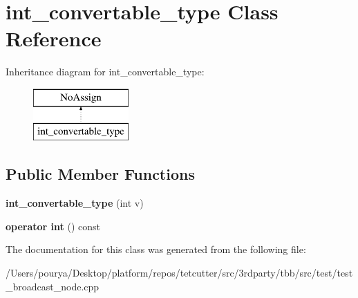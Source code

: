 \hypertarget{classint__convertable__type}{}\section{int\+\_\+convertable\+\_\+type Class Reference}
\label{classint__convertable__type}
Inheritance diagram for int\+\_\+convertable\+\_\+type\+:\begin{figure}[H]
\begin{center}
\leavevmode
\includegraphics[height=2.000000cm]{classint__convertable__type}
\end{center}
\end{figure}
\subsection*{Public Member Functions}
\begin{DoxyCompactItemize}
\item 
\hypertarget{classint__convertable__type_a193f7a1bb15319776976e6583d0b3f6a}{}{\bfseries int\+\_\+convertable\+\_\+type} (int v)\label{classint__convertable__type_a193f7a1bb15319776976e6583d0b3f6a}

\item 
\hypertarget{classint__convertable__type_a4502138630234f66570864cc8edec7ae}{}{\bfseries operator int} () const \label{classint__convertable__type_a4502138630234f66570864cc8edec7ae}

\end{DoxyCompactItemize}


The documentation for this class was generated from the following file\+:\begin{DoxyCompactItemize}
\item 
/\+Users/pourya/\+Desktop/platform/repos/tetcutter/src/3rdparty/tbb/src/test/test\+\_\+broadcast\+\_\+node.\+cpp\end{DoxyCompactItemize}
